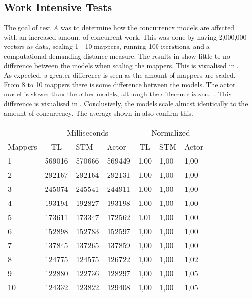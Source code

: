\subsection{Work Intensive Tests}
The goal of test $A$ was to determine how the concurrency models are affected with an increased amount of concurrent work. This was done by having 2,000,000 vectors as data, scaling 1 - 10 mappers, running 100 iterations, and a computational demanding distance measure. The results in  show little to no difference between the models when scaling the mappers. This is visualised in . As expected, a greater difference is seen as the amount of mappers are scaled. From 8 to 10 mappers there is some difference between the models. The actor model is slower than the other models, although the difference is small. This difference is visualised in . Conclusively, the models scale almost identically to the amount of concurrency. The average shown in  also confirm this.
%
\begin{center}
\begin{table}[h]
\centering
\begin{tabular}{l|cll|cll}
             & \multicolumn{3}{c|}{Milliseconds} & \multicolumn{3}{c}{Normalized} \\
Mappers & TL     & STM     & Actor     & TL      & STM      & Actor     \\ \hline
1   &   569016	  &      570666      &    569449	&  1,00   & 1,00 &    1,00    \\
2   &   292167      &      292164      &    292131  &  1,00   & 1,00 &    1,00    \\
3   &   245074      &      245541      &    244911  &  1,00   & 1,00 &    1,00    \\
4   &   193194      &      192827      &    193198  &  1,00   & 1,00 &    1,00    \\
5   &   173611      &      173347      &    172562  &  1,01   & 1,00 &    1,00    \\
6   &   152898      &      152783      &    152597  &  1,00   & 1,00 &    1,00    \\
7   &   137845      &      137265      &    137859  &  1,00   & 1,00 &    1,00    \\
8   &   124775      &      124575      &    126722  &  1,00   & 1,00 &    1,02    \\
9   &   122880      &      122736      &    128297  &  1,00   & 1,00 &    1,05    \\
10 &   124332      &      123822      &    129408  &  1,00   & 1,00 &    1,05    \\
\end{tabular}
\label{table:test_results_a}
\end{table}
\end{center}
